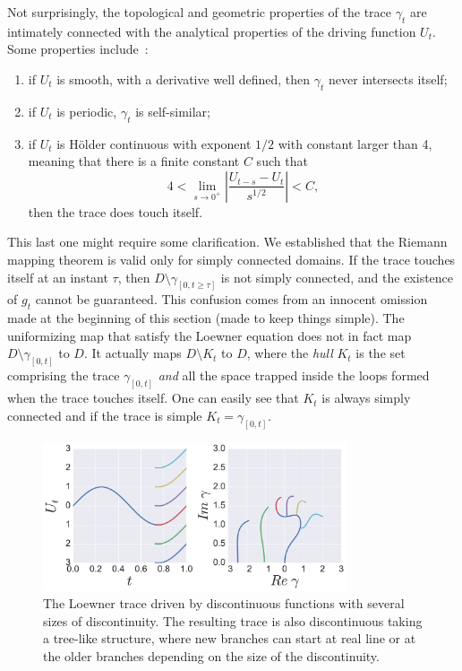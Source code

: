 Not surprisingly, the topological and geometric properties of the trace
$\gamma_t$ are intimately connected with the analytical properties of the
driving function $U_t$. Some properties include~\cite{Gruzberg2004}:
\begin{enumerate}
    \item if $U_t$ is smooth, with a derivative well defined, then $\gamma_t$
        never intersects itself;
    \item if $U_t$ is periodic, $\gamma_t$ is self-similar;
    \item if $U_t$ is H\"older continuous with exponent $1/2$ with constant
        larger than 4, meaning that there is a finite constant $C$ such that
        \begin{equation}
            \label{eq:holder}
            4<\lim_{s\rightarrow0^{+}}\left|
                \frac{U_{t-s}-U_{t}}{s^{1/2}}\right|
            <C,
        \end{equation}
        then the trace does touch itself.
\end{enumerate}
This last one might require some clarification. We established that the Riemann
mapping theorem is valid only for simply connected domains. If the trace touches
itself at an instant $\tau$, then $D\setminus\gamma_{[0,t\geq\tau]}$ is not
simply connected, and the existence of $g_t$ cannot be guaranteed. This
confusion comes from an innocent omission made at the beginning of this
section (made to keep things simple). The uniformizing map that satisfy the
Loewner equation does not in fact map $D\setminus\gamma_{[0,t]}$ to $D$. It
actually maps $D\setminus K_t$ to $D$, where the \textit{hull} $K_t$ is the set
comprising the trace $\gamma_{[0,t]}$ \textit{and} all the space trapped inside
the loops formed when the trace touches itself. One can easily see that $K_t$
is always simply connected and if the trace is simple $K_t = \gamma_{[0,t]}$.

\begin{figure}[b]
\begin{center}
    \includegraphics[width=0.8\textwidth]{chapters/ch4-sle/figs/discle}
\end{center}
\caption{The Loewner trace driven by discontinuous functions with several sizes
    of discontinuity. The resulting trace is also discontinuous taking a
    tree-like structure, where new branches can start at real line or at the
    older branches depending on the size of the discontinuity.}
\label{fig:discle}
\end{figure}

